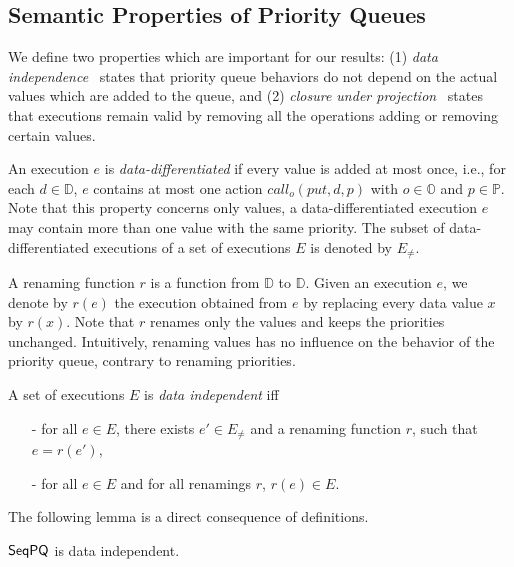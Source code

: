 \documentclass[a4paper,UKenglish]{lipics-v2016}
\begin{document}
\subsection{Semantic Properties of Priority Queues}\label{ssec:semantic_prop}

We define two properties which are 
important for our results: (1) \emph{data independence}~\cite{conf/popl/Wolper86,conf/tacas/AbdullaHHJR13} states that priority queue behaviors do not depend on the actual values which are added to the queue, and (2) \emph{closure under projection}~\cite{DBLP:conf/icalp/BouajjaniEEH15} states that executions remain valid by removing all the operations adding or removing certain values.

An execution $e$ is \emph{data-differentiated} if every value is added at most once, i.e., for each $d \in \mathbb{D}$, $e$ contains at most one action $\textit{call}_o(\textit{put},d,p)$ with $o\in\mathbb{O}$ and $p\in \mathbb{P}$. Note that this property concerns only values, a data-differentiated execution $e$ may contain more than one value with the same priority. The subset of data-differentiated executions of a set of executions $E$ is denoted by $E_{\neq}$.

A renaming function $r$ is a function from $\mathbb{D}$ to $\mathbb{D}$. Given an execution $e$, we denote by $r(e)$ the execution obtained from $e$ by replacing every data value $x$ by $r(x)$. Note that $r$ renames only the values and keeps the priorities unchanged. Intuitively, renaming values has no influence on the behavior of the priority queue, contrary to renaming priorities.

\begin{definition}\label{def:priority-value data-independence}
A set of executions $E$ is \emph{data independent} iff
\begin{itemize}
\setlength{\itemsep}{0.5pt}
\item[-] for all $e \in E$, there exists $e' \in E_{\neq}$ and a renaming function $r$, such that $e=r(e')$,

\item[-] for all $e \in E$ and for all renamings $r$, $r(e) \in E$.
\end{itemize}
\end{definition}

The following lemma is a direct consequence of definitions.

\begin{lemma}
$\mathsf{SeqPQ}$ is data independent.
\end{lemma}
\end{document}
